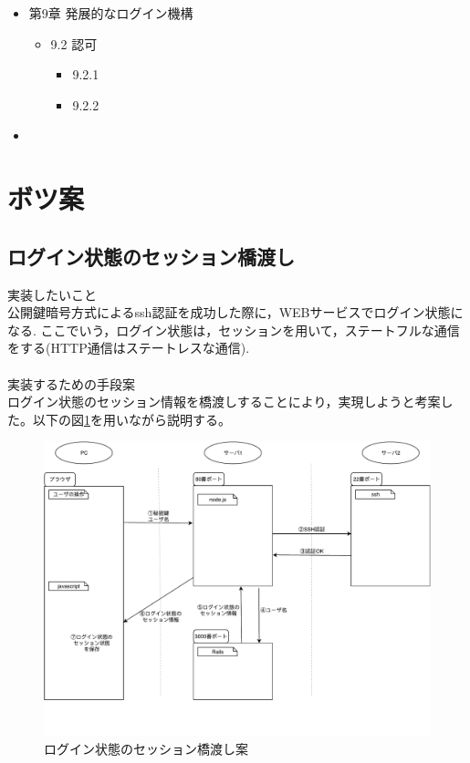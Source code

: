 \begin{itemize}
    \item 第9章 発展的なログイン機構
    \begin{itemize}
        \item 9.2 認可
        \begin{itemize}
            \item 9.2.1
            \item 9.2.2
        \end{itemize}

    \end{itemize}


\end{itemize}

    \begin{itemize}
        \item
    \end{itemize}



\section{ボツ案}
\subsection{ログイン状態のセッション橋渡し}
\noindent 実装したいこと\\
公開鍵暗号方式によるssh認証を成功した際に，WEBサービスでログイン状態になる.
ここでいう，ログイン状態は，セッションを用いて，ステートフルな通信をする(HTTP通信はステートレスな通信).
\\\\
\noindent 実装するための手段案\\
ログイン状態のセッション情報を橋渡しすることにより，実現しようと考案した。以下の図\ref{botu1-1}を用いながら説明する。

\begin{figure}[h]
    \includegraphics[width=13cm]{fig/chapter3/botu1-1.pdf}
    \caption{ログイン状態のセッション橋渡し案} 
    \label{botu1-1}
\end{figure}

